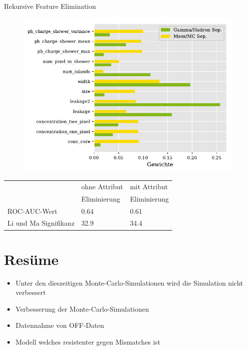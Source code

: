 \documentclass[aspectratio=1610, professionalfonts, 9pt]{beamer}
\begin{document}
\begin{frame}{Rekursive Feature Elimination}
  \begin{figure}
	\centering
	\includegraphics[height=0.8\textheight]{./Plots/feature_elemination.pdf}
  \end{figure}
\end{frame}

\begin{frame}
  \begin{table}
	\centering
	\begin{tabular}{l s s}
	  \toprule
	  & ohne Attribut & mit Attribut \\
	  & Eliminierung  & Eliminierung \\
	  \cmidrule(r){2-3}
	  ROC-AUC-Wert            & \num{0.64} & \num{0.61} \\
	  Li und Ma Signifikanz   & \SI{32.9}{\sigma} & \SI{34.4}{\sigma} \\
	  \bottomrule
	\end{tabular}
  \end{table}
\end{frame}

\section{Resüme}
\begin{frame}
  \begin{itemize}
	\item<1-> Unter den dieszeitigen Monte-Carlo-Simulationen wird die Simulation nicht verbessert 
	\item<2-> Verbesserung der Monte-Carlo-Simulationen 
	\item<3-> Datennahme von OFF-Daten
	\item<4-> Modell welches resistenter gegen Mismatches ist
  \end{itemize}
\end{frame}
\end{document}
